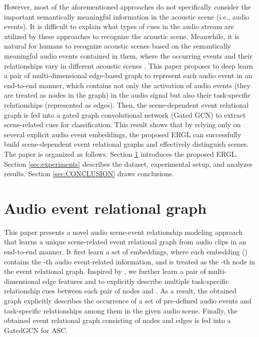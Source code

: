 \documentclass{article}
\begin{document}
However, most of the aforementioned approaches do not specifically consider the important semantically meaningful information in the acoustic scene (i.e., audio events). 
It is difficult to explain what types of cues in the audio stream are utilized by these approaches to recognize the acoustic scene. 
Meanwhile, it is natural for humans to recognize acoustic scenes based on the semantically meaningful audio events contained in them, where the occurring events and their relationships vary in different acoustic scenes \cite{dick}. 
This paper proposes to deep learn a pair of multi-dimensional edge-based graph to represent each audio event in an end-to-end manner, which contains not only the activation of audio events (they are treated as nodes in the graph) in the audio signal but also their task-specific relationships (represented as edges).
Then, the scene-dependent event relational graph is fed into a gated graph convolutional network (Gated GCN) to extract scene-related cues for classification.
This result shows that by relying only on several explicit audio event embeddings, the proposed ERGL can successfully build scene-dependent event relational graphs and effectively distinguish scenes.
The paper is organized as follows. Section \ref{sec:format} introduces the proposed ERGL. Section \ref{sec:experiments} describes the dataset, experimental setup, and analyzes results. Section \ref{sec:CONCLUSION} draws conclusions.








\vspace{-0.3cm}
\section{Audio \textbf{e}vent \textbf{r}elational \textbf{g}raph}
\label{sec:format}



\vspace{-0.2cm}

This paper presents a novel audio scene-event relationship modeling approach that learns a unique scene-related event relational graph from audio clips in an end-to-end manner. It first learn a set of embeddings, where each embedding () contains the -th audio event-related information, and is treated as the -th node in the event relational graph. 
Inspired by \cite{luo2022learning,song2021learning}, we further learn a pair of multi-dimensional edge features  and   to explicitly describe multiple task-specific relationship cues between each pair of nodes  and . As a result, the obtained graph explicitly describes the occurrence of a set of pre-defined audio events
and task-specific relationships among them in the given audio scene. 
Finally, the obtained event relational graph consisting of  nodes and  edges is fed into a GatedGCN \cite{gated_GCN} for ASC.
\end{document}

